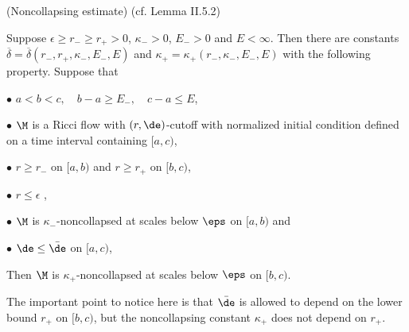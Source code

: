 \begin{lemma}
  \label{lem:kl-establishing-noncollapsing-presence-surgery-existence-kappa-solutions}
(Noncollapsing estimate) (cf. Lemma II.5.2)
\label{II.5.2}

Suppose $\epsilon \ge r_- \ge r_+ >0$, $\kappa_->0$, $E_->0$ and $E<\infty$.
Then there are constants $\overline{\delta} =
\overline{\delta}(r_-,r_+,\kappa_-,E_-,E)$
and $\kappa_+=\kappa_+(r_-,\kappa_-,E_-,E)$ with
the following property.  Suppose that

$\bullet$  $a<b<c,\quad b-a\geq E_-,\quad c-a\leq E$,

$\bullet$  $\M$ is a Ricci flow with $(r,\de)$-cutoff
with normalized initial condition
defined on a time interval containing $[a,c)$,

$\bullet$ $r\geq r_-$ on $[a,b)$ and $r\geq r_+$ on $[b,c)$,

$\bullet$ $r \le \epsilon$ ,

$\bullet$ $\M$ is $\kappa_-$-noncollapsed at scales below
$\eps$ on $[a,b)$ and

$\bullet$ $\de\leq \bar\de$ on $[a,c)$,


Then $\M$ is $\kappa_+$-noncollapsed at scales below $\eps$
on $[b,c)$.
\end{lemma}
\begin{remark}
  \label{rem:kl-establishing-noncollapsing-presence-surgery-estimates-kappa-solutions}

The important point to notice here is that $\bar\de$ is allowed
to depend on the lower bound $r_+$ on $[b,c)$, but the
noncollapsing constant $\kappa_+$ does not depend on $r_+$.
\end{remark}
